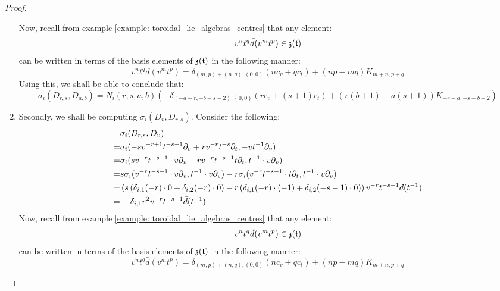 \begin{proof}
\begin{enumerate}
                    Now, recall from example \ref{example: toroidal_lie_algebras_centres} that any element:
                        $$v^n t^q \bar{d}(v^m t^p) \in \mathfrak{z}(\mathfrak{t})$$
                    can be written in terms of the basis elements of $\mathfrak{z}(\mathfrak{t})$ in the following manner:
                        $$v^n t^q \bar{d}(v^m t^p) = \delta_{(m, p) + (n, q), (0, 0)} ( n c_v + q c_t ) + (np - mq) K_{m + n, p + q}$$
                    Using this, we shall be able to conclude that:
                        $$\sigma_i(D_{r, s}, D_{a, b}) = N_i(r, s, a, b) \left( -\delta_{ (-a - r, -b - s - 2), (0, 0) } (r c_v + (s + 1) c_t) + ( r(b + 1) - a(s + 1) )K_{-r - a, -s - b - 2} \right)$$
                    \item Secondly, we shall be computing $\sigma_i(D_v, D_{r, s})$. Consider the following:
                        $$
                            \begin{aligned}
                                & \sigma_i(D_{r, s}, D_v)
                                \\
                                = & \sigma_i( -s v^{-r + 1} t^{-s - 1} \partial_v + r v^{-r} t^{-s} \partial_t, -v t^{-1} \partial_v )
                                \\
                                = & \sigma_i( s v^{-r} t^{-s - 1} \cdot v \partial_v - r v^{-r} t^{-s - 1} t \partial_t, t^{-1} \cdot v \partial_v )
                                \\
                                = & s \sigma_i( v^{-r} t^{-s - 1} \cdot v \partial_v, t^{-1} \cdot v \partial_v ) - r\sigma_i( v^{-r} t^{-s - 1} \cdot t \partial_t, t^{-1} \cdot v \partial_v )
                                \\
                                = & \left( s \left( \delta_{i, 1} (-r) \cdot 0 + \delta_{i, 2} (-r) \cdot 0 \right) - r\left( \delta_{i, 1} (-r) \cdot (-1) + \delta_{i, 2} (-s - 1) \cdot 0 \right) \right) v^{-r} t^{-s - 1} \bar{d}(t^{-1}) 
                                \\
                                = & -\delta_{i, 1} r^2 v^{-r} t^{-s - 1} \bar{d}(t^{-1})
                            \end{aligned}
                        $$
                    Now, recall from example \ref{example: toroidal_lie_algebras_centres} that any element:
                        $$v^n t^q \bar{d}(v^m t^p) \in \mathfrak{z}(\mathfrak{t})$$
                    can be written in terms of the basis elements of $\mathfrak{z}(\mathfrak{t})$ in the following manner:
                        $$v^n t^q \bar{d}(v^m t^p) = \delta_{(m, p) + (n, q), (0, 0)} ( n c_v + q c_t ) + (np - mq) K_{m + n, p + q}$$

\end{enumerate}
\end{proof}
